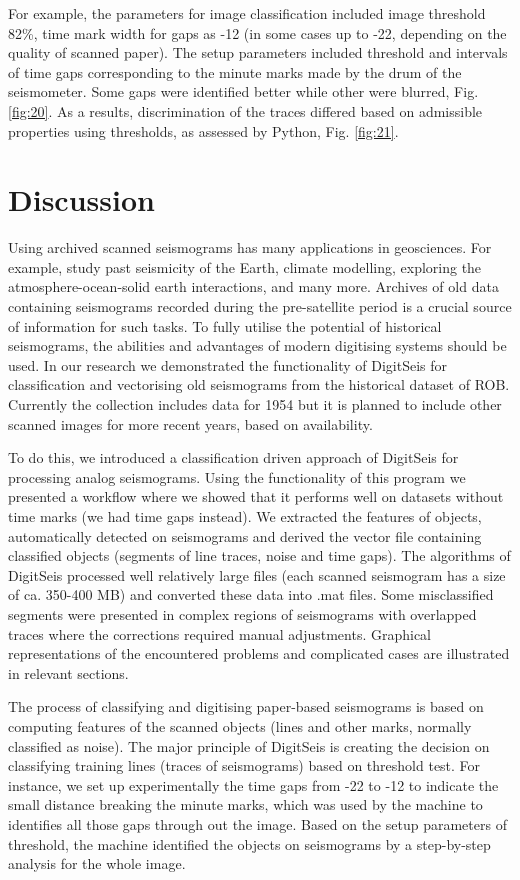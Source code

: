 \documentclass[sensors,article,submit,moreauthors,pdftex]{Definitions/mdpi}
\begin{document}
For example, the parameters for image classification included image threshold 82\%, time mark width for gaps as -12 (in some cases up to -22, depending on the quality of scanned paper). The setup parameters included threshold and intervals of time gaps corresponding to the minute marks made by the drum of the seismometer. Some gaps were identified better while other were blurred, Fig. \ref{fig:20}. As a results, discrimination of the traces differed based on admissible properties using thresholds, as assessed by Python, Fig. \ref{fig:21}. 

\section{Discussion}

Using archived scanned seismograms has many applications in geosciences. For example, study past seismicity of the Earth, climate modelling, exploring the atmosphere-ocean-solid earth interactions, and many more. Archives of old data containing seismograms recorded during the pre-satellite period is a crucial source of information for such tasks. To fully utilise the potential of historical seismograms, the abilities and advantages of modern digitising systems should be used. In our research we demonstrated the functionality of DigitSeis for classification and vectorising old seismograms from the historical dataset of \ac{ROB}. Currently the collection includes data for 1954 but it is planned to include other scanned images for more recent years, based on availability. 

To do this, we introduced a classification driven approach of DigitSeis for processing analog seismograms. Using the functionality of this program we presented a workflow where we showed that it performs well on datasets without time marks (we had time gaps instead). We extracted the features of objects, automatically detected on seismograms and derived the vector file containing classified objects (segments of line traces, noise and time gaps). The algorithms of DigitSeis processed well relatively large files (each scanned seismogram has a size of ca. 350-400 MB) and converted these data into .mat files. Some misclassified segments were presented in complex regions of seismograms with overlapped traces where the corrections required manual adjustments. Graphical representations of the encountered problems and complicated cases are illustrated in relevant sections. 

The process of classifying and digitising paper-based seismograms is based on computing features of the scanned objects (lines and other marks, normally classified as noise). The major principle of DigitSeis is creating the decision on classifying training lines (traces of seismograms) based on threshold test. For instance, we set up experimentally the time gaps from -22 to -12 to indicate the small distance breaking the minute marks, which was used by the machine to identifies all those gaps through out the image. Based on the setup parameters of threshold, the machine identified the objects on seismograms by a step-by-step analysis for the whole image.
\end{document}
